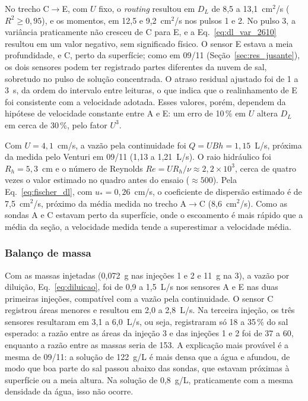 \documentclass[12pt,a4paper]{article}
\begin{document}
No trecho C$\rightarrow$E, com $U$ fixo, o \emph{routing} resultou em $D_L$ de 8,5 a 13,1~cm$^2$/s ($R^2 \geq 0{,}95$), e os momentos, em 12,5 e 9,2~cm$^2$/s nos pulsos 1 e 2. No pulso 3, a variância praticamente não cresceu de C para E, e a Eq.~\eqref{eq:dl_var_2610} resultou em um valor negativo, sem significado físico. O sensor E estava a meia profundidade, e C, perto da superfície; como em 09/11 (Seção~\ref{sec:res_jusante}), os dois sensores podem ter registrado partes diferentes da nuvem de sal, sobretudo no pulso de solução concentrada. O atraso residual ajustado foi de 1 a 3~s, da ordem do intervalo entre leituras, o que indica que o realinhamento de E foi consistente com a velocidade adotada. Esses valores, porém, dependem da hipótese de velocidade constante entre A e E: um erro de 10\,\% em $U$ altera $D_L$ em cerca de 30\,\%, pelo fator $U^3$.

Com $U = 4{,}1$~cm/s, a vazão pela continuidade foi $Q = U B h = 1{,}15$~L/s, próxima da medida pelo Venturi em 09/11 (1,13 a 1,21~L/s). O raio hidráulico foi $R_h = 5{,}3$~cm e o número de Reynolds $Re = U R_h/\nu \approx 2{,}2\times10^{3}$, cerca de quatro vezes o valor estimado no quadro antes do ensaio ($\approx 500$). Pela Eq.~\eqref{eq:fischer_dl}, com $u_* = 0{,}26$~cm/s, o coeficiente de dispersão estimado é de 7,5~cm$^2$/s, próximo da média medida no trecho A$\rightarrow$C (8,6~cm$^2$/s). Como as sondas A e C estavam perto da superfície, onde o escoamento é mais rápido que a média da seção, a velocidade medida tende a superestimar a velocidade média.

\subsubsection{Balanço de massa}
Com as massas injetadas (0,072~g nas injeções 1 e 2 e 11~g na 3), a vazão por diluição, Eq.~\eqref{eq:diluicao}, foi de 0,9 a 1,5~L/s nos sensores A e E nas duas primeiras injeções, compatível com a vazão pela continuidade. O sensor C registrou áreas menores e resultou em 2,0 a 2,8~L/s. Na terceira injeção, os três sensores resultaram em 3,1 a 6,0~L/s, ou seja, registraram só 18 a 35\,\% do sal esperado: a razão entre as áreas da injeção 3 e das injeções 1 e 2 foi de 37 a 60, enquanto a razão entre as massas seria de 153. A explicação mais provável é a mesma de 09/11: a solução de 122~g/L é mais densa que a água e afundou, de modo que boa parte do sal passou abaixo das sondas, que estavam próximas à superfície ou a meia altura. Na solução de 0,8~g/L, praticamente com a mesma densidade da água, isso não ocorre.
\end{document}
